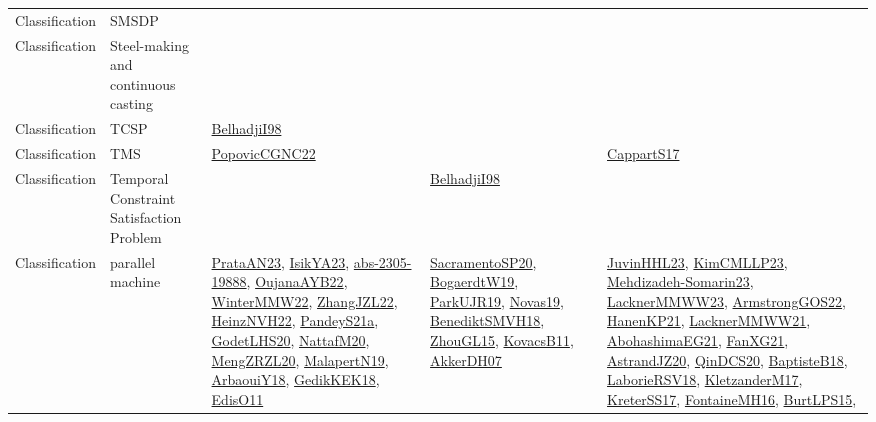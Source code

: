 {\begin{longtable}{lp{3cm}>{\raggedright}p{6cm}>{\raggedright}p{6cm}p{8cm}}
Classification & SMSDP &  &  & \\
Classification & Steel-making and continuous casting &  &  & \\
Classification & TCSP & \href{articles/BelhadjiI98.pdf}{BelhadjiI98}\cite{BelhadjiI98} &  & \\
Classification & TMS & \href{papers/PopovicCGNC22.pdf}{PopovicCGNC22}\cite{PopovicCGNC22} &  & \href{papers/CappartS17.pdf}{CappartS17}\cite{CappartS17}\\
Classification & Temporal Constraint Satisfaction Problem &  & \href{articles/BelhadjiI98.pdf}{BelhadjiI98}\cite{BelhadjiI98} & \\
Classification & parallel machine & \href{articles/PrataAN23.pdf}{PrataAN23}\cite{PrataAN23}, \href{articles/IsikYA23.pdf}{IsikYA23}\cite{IsikYA23}, \href{articles/abs-2305-19888.pdf}{abs-2305-19888}\cite{abs-2305-19888}, \href{papers/OujanaAYB22.pdf}{OujanaAYB22}\cite{OujanaAYB22}, \href{papers/WinterMMW22.pdf}{WinterMMW22}\cite{WinterMMW22}, \href{papers/ZhangJZL22.pdf}{ZhangJZL22}\cite{ZhangJZL22}, \href{articles/HeinzNVH22.pdf}{HeinzNVH22}\cite{HeinzNVH22}, \href{articles/PandeyS21a.pdf}{PandeyS21a}\cite{PandeyS21a}, \href{papers/GodetLHS20.pdf}{GodetLHS20}\cite{GodetLHS20}, \href{papers/NattafM20.pdf}{NattafM20}\cite{NattafM20}, \href{articles/MengZRZL20.pdf}{MengZRZL20}\cite{MengZRZL20}, \href{papers/MalapertN19.pdf}{MalapertN19}\cite{MalapertN19}, \href{papers/ArbaouiY18.pdf}{ArbaouiY18}\cite{ArbaouiY18}, \href{articles/GedikKEK18.pdf}{GedikKEK18}\cite{GedikKEK18}, \href{papers/EdisO11.pdf}{EdisO11}\cite{EdisO11} & \href{articles/SacramentoSP20.pdf}{SacramentoSP20}\cite{SacramentoSP20}, \href{papers/BogaerdtW19.pdf}{BogaerdtW19}\cite{BogaerdtW19}, \href{papers/ParkUJR19.pdf}{ParkUJR19}\cite{ParkUJR19}, \href{articles/Novas19.pdf}{Novas19}\cite{Novas19}, \href{papers/BenediktSMVH18.pdf}{BenediktSMVH18}\cite{BenediktSMVH18}, \href{papers/ZhouGL15.pdf}{ZhouGL15}\cite{ZhouGL15}, \href{articles/KovacsB11.pdf}{KovacsB11}\cite{KovacsB11}, \href{papers/AkkerDH07.pdf}{AkkerDH07}\cite{AkkerDH07} & \href{papers/JuvinHHL23.pdf}{JuvinHHL23}\cite{JuvinHHL23}, \href{papers/KimCMLLP23.pdf}{KimCMLLP23}\cite{KimCMLLP23}, \href{papers/Mehdizadeh-Somarin23.pdf}{Mehdizadeh-Somarin23}\cite{Mehdizadeh-Somarin23}, \href{articles/LacknerMMWW23.pdf}{LacknerMMWW23}\cite{LacknerMMWW23}, \href{papers/ArmstrongGOS22.pdf}{ArmstrongGOS22}\cite{ArmstrongGOS22}, \href{papers/HanenKP21.pdf}{HanenKP21}\cite{HanenKP21}, \href{papers/LacknerMMWW21.pdf}{LacknerMMWW21}\cite{LacknerMMWW21}, \href{articles/AbohashimaEG21.pdf}{AbohashimaEG21}\cite{AbohashimaEG21}, \href{articles/FanXG21.pdf}{FanXG21}\cite{FanXG21}, \href{articles/AstrandJZ20.pdf}{AstrandJZ20}\cite{AstrandJZ20}, \href{articles/QinDCS20.pdf}{QinDCS20}\cite{QinDCS20}, \href{articles/BaptisteB18.pdf}{BaptisteB18}\cite{BaptisteB18}, \href{articles/LaborieRSV18.pdf}{LaborieRSV18}\cite{LaborieRSV18}, \href{papers/KletzanderM17.pdf}{KletzanderM17}\cite{KletzanderM17}, \href{articles/KreterSS17.pdf}{KreterSS17}\cite{KreterSS17}, \href{papers/FontaineMH16.pdf}{FontaineMH16}\cite{FontaineMH16}, \href{papers/BurtLPS15.pdf}{BurtLPS15}\cite{BurtLPS15}, 
\end{longtable}}
